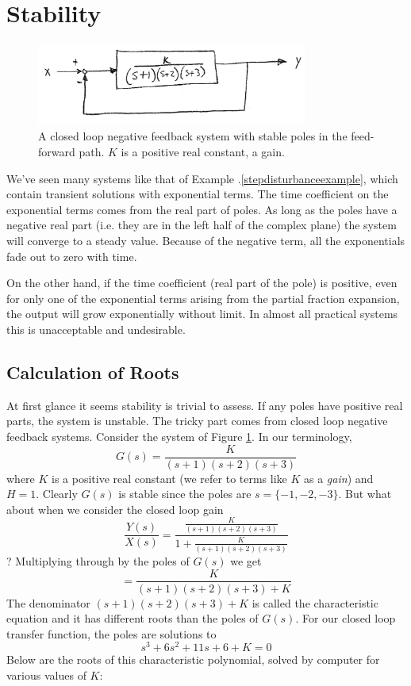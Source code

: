 \section{Stability}\label{FeedbackStabilitySection}


\begin{figure}\centering
\includegraphics[width=3.5in]{figs06/00779a.png}
\caption{A closed loop negative feedback system with stable poles in the feed-forward path. $K$ is a positive real constant, a gain.}\label{openloopstable}
\end{figure}

We've seen many systems like that of Example \thechapter.\ref{stepdisturbanceexample}, which contain transient solutions with exponential terms. 
The time coefficient on the exponential terms comes from the real part of poles.
As long as the poles have a negative real part (i.e. they are in the left half of the complex plane) 
the system will converge to a steady value.  
Because of the negative term, all the exponentials fade out to zero with time.

On the other hand, if the time coefficient (real part of the pole) is positive, even for only one of the exponential terms arising from the partial fraction expansion, the output will grow exponentially without limit.  In almost all practical systems this is unacceptable and undesirable.     

\subsection{Calculation of Roots}\label{calculationofroots}

At first glance it seems stability is trivial to assess.  If any poles have positive real parts, the system is unstable.  The tricky part comes from closed loop negative feedback systems.   Consider the system of Figure \ref{openloopstable}.  In our terminology,
\[
G(s) =  \frac  {K}  {(s+1)(s+2)(s+3)}
\]
where $K$ is a positive real constant (we refer to terms like $K$ as a {\it gain}) and $H=1$.
Clearly $G(s)$ is stable since the poles are $s=\{-1, -2, -3\}$.
But what about when we consider the closed loop gain
\[
\frac{Y(s)}{X(s)} =  \frac{\frac{K}{(s+1)(s+2)(s+3)}}  {1+ \frac  {K}  {(s+1)(s+2)(s+3)}}
\]
?
\noindent
Multiplying through by the poles of $G(s)$ we get
\[
= \frac {K}  {(s+1)(s+2)(s+3) + K}
\]
The denominator $(s+1)(s+2)(s+3) + K$ is called the characteristic equation and it has different roots than the poles of $G(s)$.   For our closed loop transfer function, the poles are solutions to
\[
s^3+6s^2+11s+6 +K = 0
\]
Below are the roots of this characteristic polynomial, solved by computer for various values of $K$:

